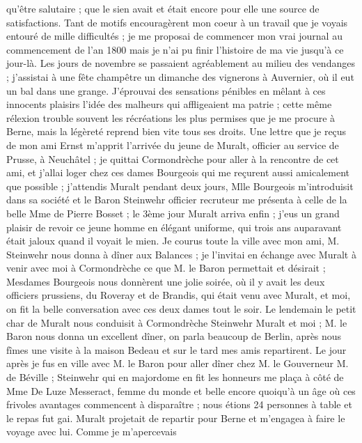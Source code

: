 \documentclass[12pt]{article}
\begin{document}
 qu’être salutaire ; que le sien avait et était
encore pour elle une source de satisfactions. Tant de motifs encouragèrent mon coeur à un travail
que je voyais entouré de mille difficultés ; je me proposai de commencer mon vrai journal au
commencement de l’an 1800 mais je n’ai pu finir l’histoire de ma vie jusqu’à ce jour-là. Les jours
de novembre se passaient agréablement au milieu des vendanges ; j’assistai à une fête champêtre un
dimanche des vignerons à Auvernier, où il eut un bal dans une grange. J’éprouvai des sensations
pénibles en mêlant à ces innocents plaisirs l’idée des malheurs qui affligeaient ma patrie ; cette
même rélexion trouble souvent les récréations les plus permises que je me procure à Berne, mais la
légèreté reprend bien vite tous ses droits. Une lettre que je reçus de mon ami Ernst m’apprit
l’arrivée du jeune de Muralt, officier au service de Prusse, à Neuchâtel ; je quittai Cormondrèche
pour aller à la rencontre de cet ami, et j’allai loger chez ces dames Bourgeois qui me reçurent
aussi amicalement que possible ; j’attendis Muralt pendant deux jours, Mlle Bourgeois m’introduisit
dans sa société et le Baron Steinwehr officier recruteur me présenta à celle de la belle Mme de
Pierre Bosset ; le 3ème jour Muralt arriva enfin ; j’eus un grand plaisir de revoir ce jeune homme
en élégant uniforme, qui trois ans auparavant était jaloux quand il voyait le mien. Je courus toute
la ville avec mon ami, M. Steinwehr nous donna à dîner aux Balances ; je l’invitai en échange avec
Muralt à venir avec moi à Cormondrèche ce que M. le Baron permettait et désirait ; Mesdames
Bourgeois nous donnèrent une jolie soirée, où il y avait les deux officiers prussiens, du Roveray et
de Brandis, qui était venu avec Muralt, et moi, on fit la belle conversation avec ces deux dames
tout le soir. Le lendemain le petit char de Muralt nous conduisit à Cormondrèche Steinwehr Muralt et
moi ; M. le Baron nous donna un excellent dîner, on parla beaucoup de Berlin, après nous fîmes une
visite à la maison Bedeau et sur le tard mes amis repartirent. Le jour après je fus en ville avec M.
le Baron pour aller dîner chez M. le Gouverneur M. de Béville ; Steinwehr qui en majordome en fit
les honneurs me plaça à côté de Mme De Luze Messeract, femme du monde et belle encore quoiqu’à un
âge où ces frivoles avantages commencent à disparaître ; nous étions 24 personnes à table et le
repas fut gai. Muralt projetait de repartir pour Berne et m’engagea à faire le voyage avec lui.
Comme je m’apercevais
\end{document}
